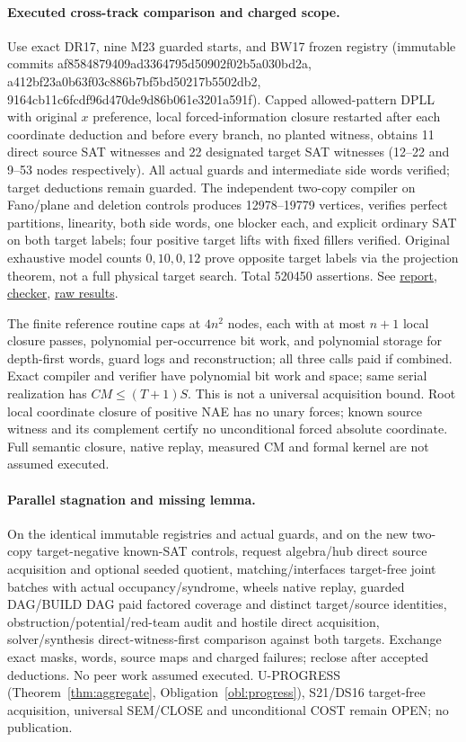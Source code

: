 \documentclass[11pt]{article}
\begin{document}
\paragraph{Executed cross-track comparison and charged scope.}
Use exact DR17, nine M23 guarded starts, and BW17 frozen registry (immutable commits af8584879409ad3364795d50902f02b5a030bd2a, a412bf23a0b63f03c886b7bf5bd50217b5502db2, 9164cb11c6fcdf96d470de9d86b061e3201a591f). Capped allowed-pattern DPLL with original $x$ preference, local forced-information closure restarted after each coordinate deduction and before every branch, no planted witness, obtains 11 direct source SAT witnesses and 22 designated target SAT witnesses (12--22 and 9--53 nodes respectively). All actual guards and intermediate side words verified; target deductions remain guarded. The independent two-copy compiler on Fano/plane and deletion controls produces 12978--19779 vertices, verifies perfect partitions, linearity, both side words, one blocker each, and explicit ordinary SAT on both target labels; four positive target lifts with fixed fillers verified. Original exhaustive model counts $0,10,0,12$ prove opposite target labels via the projection theorem, not a full physical target search. Total 520450 assertions. See \href{https://github.com/j15marti/pnp/commit/9ec27f85e8347f145ea0c78ee499edaa01277237}{report}, \href{https://github.com/j15marti/pnp/commit/606f82e6c22bd93326f9b078e9a8b7d03bbdb646}{checker}, \href{https://github.com/j15marti/pnp/commit/f665182623bc8c2fd9f8f64e9d2b204c7b88b6b3}{raw results}.
 
The finite reference routine caps at $4n^2$ nodes, each with at most $n+1$ local closure passes, polynomial per-occurrence bit work, and polynomial storage for depth-first words, guard logs and reconstruction; all three calls paid if combined. Exact compiler and verifier have polynomial bit work and space; same serial realization has $CM\le(T+1)S$. This is not a universal acquisition bound. Root local coordinate closure of positive NAE has no unary forces; known source witness and its complement certify no unconditional forced absolute coordinate. Full semantic closure, native replay, measured CM and formal kernel are not assumed executed.
\paragraph{Parallel stagnation and missing lemma.}
On the identical immutable registries and actual guards, and on the new two-copy target-negative known-SAT controls, request algebra/hub direct source acquisition and optional seeded quotient, matching/interfaces target-free joint batches with actual occupancy/syndrome, wheels native replay, guarded DAG/BUILD DAG paid factored coverage and distinct target/source identities, obstruction/potential/red-team audit and hostile direct acquisition, solver/synthesis direct-witness-first comparison against both targets. Exchange exact masks, words, source maps and charged failures; reclose after accepted deductions. No peer work assumed executed. U-PROGRESS (Theorem~\ref{thm:aggregate}, Obligation~\ref{obl:progress}), S21/DS16 target-free acquisition, universal SEM/CLOSE and unconditional COST remain OPEN; no publication.
\end{document}
